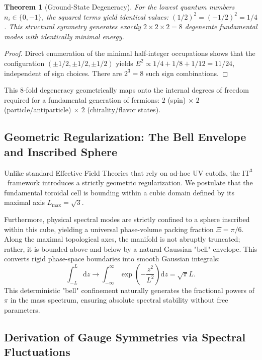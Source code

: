\documentclass[onecolumn,aps,prd,superscriptaddress,nofootinbib,amsmath,amssymb]{revtex4-2}
\newtheorem{theorem}{Theorem}[section]
\theoremstyle{definition}
\theoremstyle{remark}
\newcommand{\ITthree}{\ensuremath{\mathrm{IT}^3}}
\newcommand{\diff}{\mathrm{d}}
\begin{document}
\begin{theorem}[Ground-State Degeneracy]
\label{thm:degeneracy}
For the lowest quantum numbers $n_i \in \{0, -1\}$, the squared terms yield identical values: $(1/2)^2 = (-1/2)^2 = 1/4$. This structural symmetry generates exactly $2 \times 2 \times 2 = 8$ degenerate fundamental modes with identically minimal energy.
\end{theorem}

\begin{proof}
Direct enumeration of the minimal half-integer occupations shows that the configuration $(\pm 1/2, \pm 1/2, \pm 1/2)$ yields $E^2 \propto 1/4 + 1/8 + 1/12 = 11/24$, independent of sign choices. There are $2^3 = 8$ such sign combinations.
\end{proof}

This 8-fold degeneracy geometrically maps onto the internal degrees of freedom required for a fundamental generation of fermions: $2$ (spin) $\times$ $2$ (particle/antiparticle) $\times$ $2$ (chirality/flavor states).

\subsection{Geometric Regularization: The Bell Envelope and Inscribed Sphere}
\label{subsec:geometric_regularization}

Unlike standard Effective Field Theories that rely on ad-hoc UV cutoffs, the \ITthree\ framework introduces a strictly geometric regularization. We postulate that the fundamental toroidal cell is bounding within a cubic domain defined by its maximal axis $L_{\text{max}} = \sqrt{3}$. 

Furthermore, physical spectral modes are strictly confined to a sphere inscribed within this cube, yielding a universal phase-volume packing fraction $\Xi = \pi/6$. Along the maximal topological axes, the manifold is not abruptly truncated; rather, it is bounded above and below by a natural Gaussian "bell" envelope. This converts rigid phase-space boundaries into smooth Gaussian integrals:
\begin{equation}
\int_{-L}^{L} \diff z \to \int_{-\infty}^{\infty} \exp\left(-\frac{z^2}{L^2}\right) \diff z = \sqrt{\pi} L.
\label{eq:gaussian_envelope}
\end{equation}
This deterministic "bell" confinement naturally generates the fractional powers of $\pi$ in the mass spectrum, ensuring absolute spectral stability without free parameters.

\subsection{Derivation of Gauge Symmetries via Spectral Fluctuations}
\label{subsec:gauge_derivation}
\end{document}
